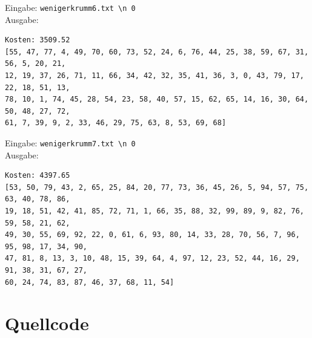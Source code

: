 \documentclass[a4paper,10pt,ngerman]{scrartcl}
\begin{document}
Eingabe: \lstinline|wenigerkrumm6.txt \n 0| \\ Ausgabe:
\begin{lstlisting}
Kosten: 3509.52
[55, 47, 77, 4, 49, 70, 60, 73, 52, 24, 6, 76, 44, 25, 38, 59, 67, 31, 56, 5, 20, 21,
12, 19, 37, 26, 71, 11, 66, 34, 42, 32, 35, 41, 36, 3, 0, 43, 79, 17, 22, 18, 51, 13, 
78, 10, 1, 74, 45, 28, 54, 23, 58, 40, 57, 15, 62, 65, 14, 16, 30, 64, 50, 48, 27, 72, 
61, 7, 39, 9, 2, 33, 46, 29, 75, 63, 8, 53, 69, 68]
\end{lstlisting}
Eingabe: \lstinline|wenigerkrumm7.txt \n 0| \\ Ausgabe:
\begin{lstlisting}
Kosten: 4397.65
[53, 50, 79, 43, 2, 65, 25, 84, 20, 77, 73, 36, 45, 26, 5, 94, 57, 75, 63, 40, 78, 86, 
19, 18, 51, 42, 41, 85, 72, 71, 1, 66, 35, 88, 32, 99, 89, 9, 82, 76, 59, 58, 21, 62, 
49, 30, 55, 69, 92, 22, 0, 61, 6, 93, 80, 14, 33, 28, 70, 56, 7, 96, 95, 98, 17, 34, 90, 
47, 81, 8, 13, 3, 10, 48, 15, 39, 64, 4, 97, 12, 23, 52, 44, 16, 29, 91, 38, 31, 67, 27, 
60, 24, 74, 83, 87, 46, 37, 68, 11, 54]
\end{lstlisting}
\section{Quellcode}

\begingroup
\def\chapter*#1{}

\endgroup
\end{document}
